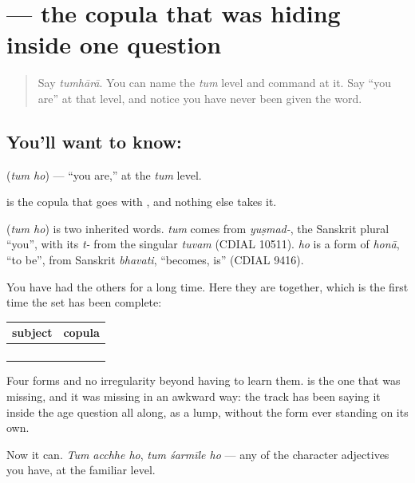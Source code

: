\section[\texorpdfstring{\hi{तुम} \hi{हो} (tum ho)}{तुम हो (tum ho)}]{  — the copula that was hiding inside one question}

\label{lesson:HI-C85-tum-ho}



\begin{quote}
Say \emph{tumhārā}. You can name the \emph{tum} level and command at it. Say \textquotedblleft{}you are\textquotedblright{} at that level, and notice you have never been given the word.
\end{quote}

\subsection*{You'll want to know:  }
\textbf{ } (\emph{tum ho}) — \textquotedblleft{}you are,\textquotedblright{} at the \emph{tum} level.

\textbf{} is the copula that goes with \textbf{}, and nothing else takes it.

\begin{cousinweb}
\textbf{ } (\emph{tum ho}) is two inherited words. \emph{tum} comes from \emph{yuṣmad-}, the Sanskrit plural \textquotedblleft{}you\textquotedblright{}, with its \emph{t-} from the singular \emph{tuvam} (CDIAL 10511). \emph{ho} is a form of \emph{honā}, \textquotedblleft{}to be\textquotedblright{}, from Sanskrit \emph{bhavati}, \textquotedblleft{}becomes, is\textquotedblright{} (CDIAL 9416).
\end{cousinweb}

\begin{grammarlens}[title={Grammar Lens: the copula, completed}]
You have had the others for a long time. Here they are together, which is the first time the set has been complete:

\noindent
\begin{tabularx}{\linewidth}{@{}>{\raggedright\arraybackslash}X>{\raggedright\arraybackslash}X@{}}
\toprule
\textbf{subject} & \textbf{copula} \\
\midrule
\hi{मैं} & \hi{हूँ} \\
\hi{तुम} & \textbf{\hi{हो}} \\
\hi{आप} & \hi{हैं} \\
\hi{वह} & \hi{है} \\
\bottomrule
\end{tabularx}

Four forms and no irregularity beyond having to learn them. \textbf{} is the one that was missing, and it was missing in an awkward way: the track has been saying it inside the age question all along, as a lump, without the form ever standing on its own.

Now it can. \emph{Tum acchhe ho}, \emph{tum śarmīle ho} — any of the character adjectives you have, at the familiar level.
\end{grammarlens}

